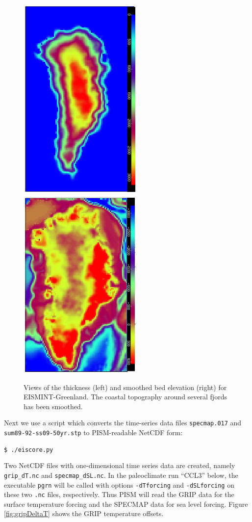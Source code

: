 \documentclass[11pt,final]{amsart}
\begin{document}
\begin{figure}[ht]
\includegraphics[width=2.4in,keepaspectratio=true]{figs/EISgreen_thick}\quad\includegraphics[width=2.4in,keepaspectratio=true]{figs/EISgreen_bed}
\caption{Views of the thickness (left) and smoothed bed elevation (right) for EISMINT-Greenland.  The coastal topography around several fjords has been smoothed.}
\label{fig:greendata}
\end{figure}

Next we use a script which converts the time-series data files \texttt{specmap.017} and \texttt{sum89-92-ss09-50yr.stp} to PISM-readable NetCDF form:

\verb|$ ./eiscore.py|

\noindent Two NetCDF files with one-dimensional time series data are created, namely \verb|grip_dT.nc| and \verb|specmap_dSL.nc|.  In the paleoclimate run ``CCL3'' below, the executable \verb|pgrn| will be called with options \verb|-dTforcing| and \verb|-dSLforcing| on these two \verb|.nc| files, respectively.  Thus PISM will read the GRIP data \cite{Dansgaardetal1993} for the surface temperature forcing and the SPECMAP data \cite{Imbrieetal1984} for sea level forcing.  Figure \ref{fig:gripDeltaT} shows the GRIP temperature offsets.
\end{document}
